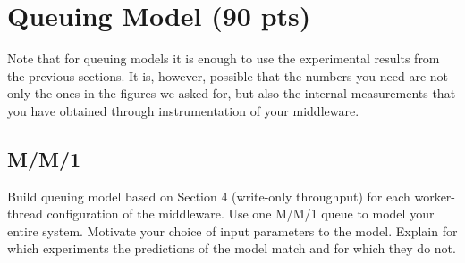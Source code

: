 \section{Queuing Model (90 pts)\label{sec:7}}

    Note that for queuing models it is enough to use the experimental results from the previous sections. It is, however, possible that the numbers you need are not only the ones in the figures we asked for, but also the internal measurements that you have obtained through instrumentation of your middleware.

    \subsection{M/M/1\label{subsec:7_mm1}}
    Build queuing model based on Section 4 (write-only throughput) for each worker-thread configuration of the middleware. Use one M/M/1 queue to model your entire system. Motivate your choice of input parameters to the model. Explain for which experiments the predictions of the model match and for which they do not.
